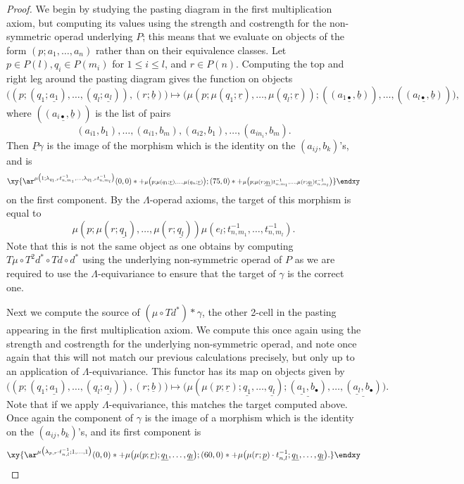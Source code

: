 \documentclass{amsbook} %
\newcommand{\un}{\underline}
\numberwithin{section}{chapter}
\begin{document}
\begin{proof}
We begin by studying the pasting diagram in the first multiplication axiom, but computing its values using the strength and costrength for the non-symmetric operad underlying $P$; this means that we evaluate on objects of the form $(p; a_{1}, \ldots, a_{n})$ rather than on their equivalence classes.  Let $p \in P(l), q_{i} \in P(m_{i})$ for $1 \leq i \leq l$, and $r \in P(n)$. Computing the top and right leg around the pasting diagram gives the function on objects
\[
\Big( (p; (q_{1}; \un{a_{1}}), \ldots, (q_{l}; \un{a_{l}})), (r; \un{b}) \Big) \mapsto \Big( \mu(p; \mu(q_{1}; \un{r}), \ldots, \mu(q_{l}; \un{r})); (\un{(a_{1\bullet}, \un{b})}), \ldots, (\un{(a_{l\bullet}, \un{b})}) \Big), \]
where $(\un{(a_{i\bullet}, \un{b})})$ is the list of pairs
\[
(a_{i1}, b_{1}), \ldots, (a_{i1}, b_{m}), (a_{i2}, b_{1}), \ldots, (a_{in_{i}}, b_{m}).
\]
Then $\un{P}\gamma$ is the image of the morphism which is the identity on the $(a_{ij}, b_{k})$'s, and is
\[
\xy
{\ar^{\scriptstyle \mu\big(1; \lambda_{q_{1}, r} t^{-1}_{n,m_{1}}, \ldots, \lambda_{q_{1}, r} t^{-1}_{n,m_{l}}\big)} (0,0)*+{\scriptstyle \mu\big(p; \mu(q_{1}; \un{r}), \ldots, \mu(q_{n}; \un{r})\big)}; (75,0)*+{\scriptstyle \mu\big(p; \mu(r; \un{q_{1}}) t^{-1}_{n,m_{1}}, \ldots, \mu(r; \un{q_{l}}) t^{-1}_{n,m_{l}} \big)} }
\endxy
\]
on the first component.  By the $\Lambda$-operad axioms, the target of this morphism is equal to
\[
\mu(p; \mu(r; \un{q_{1}}), \ldots, \mu(r; \un{q_{l}}) )\mu(e_{l}; t^{-1}_{n,m_{1}}, \ldots, t^{-1}_{n,m_{l}}).
\]
Note that this is not the same object as one obtains by computing $T\mu \circ T^{2}d^{*} \circ Td \circ d^{*}$ using the underlying non-symmetric operad of $P$ as we are required to use the $\Lambda$-equivariance to ensure that the target of $\gamma$ is the correct one.

Next we compute the source of $(\mu \circ Td^{*})*\gamma$, the other 2-cell in the pasting appearing in the first multiplication axiom.  We compute this once again using the strength and costrength for the underlying non-symmetric operad, and note once again that this will not match our previous calculations precisely, but only up to an application of $\Lambda$-equivariance.  This functor has its map on objects given by
\[
 \Big( (p; (q_{1}; \un{a_{1}}), \ldots, (q_{l}; \un{a_{l}})), (r; \un{b}) \Big) \mapsto \Big(\mu(\mu(p; \un{r}); \un{q_{1}}, \ldots, \un{q_{l}}); \un{(\un{a_{1}}, b_{\bullet})}, \ldots, \un{(\un{a_{l}}, b_{\bullet})} \Big).
\]
Note that if we apply $\Lambda$-equivariance, this matches the target computed above. Once again the component of $\gamma$ is the image of a morphism which is the identity on the $(a_{ij}, b_{k})$'s, and its first component is
\[
\xy
{\ar^{\mu\big(\lambda_{p,r} \cdot t^{-1}_{n,l}; 1, \ldots, 1\big)} (0,0)*+{\mu\big(\mu(p; \un{r}); \un{q_{1}}, \ldots, \un{q_{l}}\big)}; (60,0)*+{\mu\big(\mu(r; \un{p})\cdot t^{-1}_{n,l}; \un{q_{1}}, \ldots, \un{q_{l}}\big).} }
\endxy
\]


\end{proof}
\end{document}
